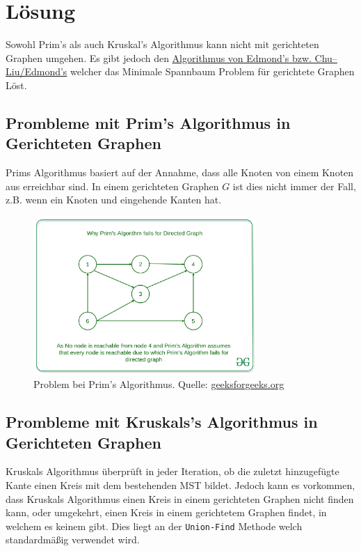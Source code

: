 \documentclass[a4paper,11pt]{report}
\begin{document}
    \section{Lösung}

    Sowohl Prim's als auch Kruskal's Algorithmus kann nicht mit gerichteten Graphen umgehen.
    Es gibt jedoch den \href{https://www.wikiwand.com/en/Edmonds%27_algorithm}{Algorithmus von Edmond's bzw. Chu–Liu/Edmond's} welcher das Minimale Spannbaum Problem für gerichtete Graphen Löst.

    \subsection{Prombleme mit Prim's Algorithmus in Gerichteten Graphen}
    Prims Algorithmus basiert auf der Annahme, dass alle Knoten von einem Knoten aus erreichbar sind.
    In einem gerichteten Graphen $G$ ist dies nicht immer der Fall, z.B. wenn ein Knoten und eingehende Kanten hat.

    \begin{figure}[htbp]
        \centering
        \includegraphics[height=6cm]{a05a_prims_issue}
        \caption{Problem bei Prim's Algorithmus. Quelle: \href{https://www.geeksforgeeks.org/why-prims-and-kruskals-mst-algorithm-fails-for-directed-graph/}{geeksforgeeks.org}}
        \label{fig:a05_prim}
    \end{figure}

    \subsection{Prombleme mit Kruskals's Algorithmus in Gerichteten Graphen}
    Kruskals Algorithmus überprüft in jeder Iteration, ob die zuletzt hinzugefügte Kante einen Kreis mit dem bestehenden MST bildet.
    Jedoch kann es vorkommen, dass Kruskals Algorithmus einen Kreis in einem gerichteten Graphen nicht finden kann,
    oder umgekehrt, einen Kreis in einem gerichtetem Graphen findet, in welchem es keinem gibt.
    Dies liegt an der \texttt{Union-Find} Methode welch standardmäßig verwendet wird.
\end{document}
